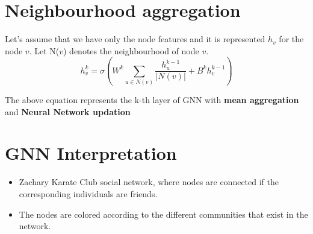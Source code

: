 \section{Neighbourhood aggregation}
    \item Let's assume that we have only the node features and it is represented $h_{v}$ for the node $v$. Let N($v$) denotes the neighbourhood of node $v$.
    \begin{equation}
        h_{v}^k = \sigma(W^k\sum_{u \in N(v)}\frac{h_u^{k-1}}{|N(v)|}+B^k h_{v}^{k-1})
    \end{equation}
        \item The above equation represents the k-th layer of GNN with \textbf{mean aggregation} and \textbf{Neural Network updation}

\section{GNN Interpretation}
    \begin{itemize}
    \item Zachary Karate Club social network, where nodes are connected if the corresponding individuals are friends.
    \item The nodes are colored according to the different communities that exist in the network.
\end{itemize}
